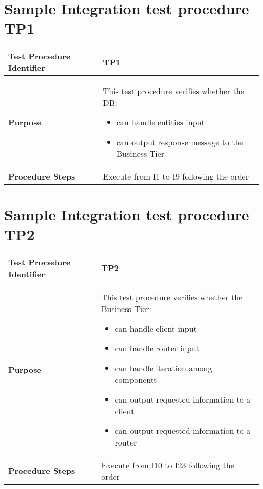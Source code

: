 \section{Sample Integration test procedure TP1} \label{TP1}
\begin{center}
	\vspace{0.6cm}
	\begin{tabular}{|l|p{9cm}|}
		\hline
		\textbf{Test Procedure Identifier} & TP1 \bigstrut \\\hline
		\textbf{Purpose} 
		& This test procedure verifies whether the DB: 
		\begin{itemize} 
			\item can handle entities input
			\item can output response message to the Business Tier %
		\end{itemize} \bigstrut \\\hline
		\textbf{Procedure Steps} & Execute from I1 to I9 following the order \bigstrut \\\hline
	\end{tabular}
\end{center}

\section{Sample Integration test procedure TP2} \label{TP2}
\begin{center}
	\vspace{0.6cm}
	\begin{tabular}{|l|p{9cm}|}
		\hline
		\textbf{Test Procedure Identifier} & TP2 \bigstrut \\\hline
		\textbf{Purpose} 
		& This test procedure verifies whether the Business Tier: 
		\begin{itemize} 
			\item can handle client input
			\item can handle router input
			\item can handle iteration among components 
			\item can output requested information to a client
			\item can output requested information to a router
		\end{itemize} \bigstrut \\\hline
		\textbf{Procedure Steps} & Execute from I10 to I23 following the order \bigstrut \\\hline
	\end{tabular}
\end{center}

